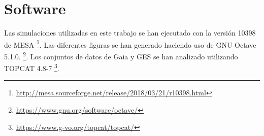 \chapter{Software}\label{ap:software}
Las simulaciones utilizadas en este trabajo se han ejecutado con la versión 10398 de MESA \footnote{\url{http://mesa.sourceforge.net/release/2018/03/21/r10398.html}}. Las diferentes figuras se han generado haciendo uso de GNU Octave 5.1.0. \footnote{\url{https://www.gnu.org/software/octave/}}. Los conjuntos de datos de Gaia y GES se han analizado utilizando TOPCAT 4.8-7 \footnote{\url{https://www.g-vo.org/topcat/topcat/}}. 

\endinput
